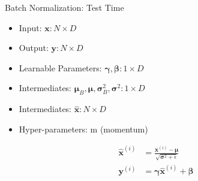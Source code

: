\begin{frame}{Batch Normalization: Test Time}
	\begin{multicols}{2}
		\begin{itemize}
			\item Input: $\pmb{x}: N\times D$
			\item Output: $\pmb{y}: N\times D$
			\item Learnable Parameters: $\pmb{\gamma}, \pmb{\beta}: 1\times D$
			\item Intermediates: $\pmb{\mu}_B, \pmb{\mu}, \pmb{\sigma}_B^2, \pmb{\sigma}^2: 1\times D$
			\item Intermediates:  $\hat{\pmb{x}}: N \times D$
			\item Hyper-parameters: m (momentum)
		\end{itemize}
	\end{multicols}
	
	
\begin{align*}
\hat{\pmb{x}}^{(i)} &= \frac{\pmb{x}^{(i)} - \pmb{\mu}}{\sqrt{\pmb{\sigma}^2 + \epsilon}}\\
\pmb{y}^{(i)} &= \pmb{\gamma} \hat{\pmb{x}}^{(i)} + \pmb{\beta}
\end{align*}
\end{frame}

